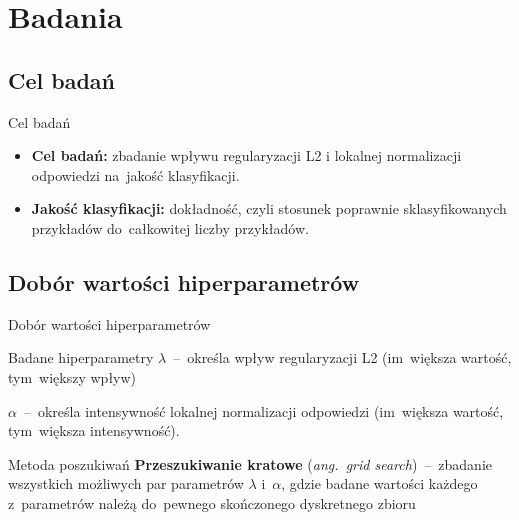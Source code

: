 \documentclass[xcolor=dvipsnames]{beamer}
\begin{document}
\section{Badania}
\subsection{Cel badań}
\begin{frame}{Cel badań}
	\begin{itemize}
	    \item \textbf{Cel badań:} zbadanie wpływu regularyzacji L2 i lokalnej normalizacji odpowiedzi na~jakość
	    klasyfikacji.
	    \item \textbf{Jakość klasyfikacji:} dokładność, czyli stosunek poprawnie sklasyfikowanych przykładów
	           do~całkowitej liczby przykładów.
    \end{itemize}
\end{frame}
\subsection{Dobór wartości hiperparametrów}
\begin{frame}{Dobór wartości hiperparametrów}
    \begin{block}{Badane hiperparametry}
        \textbf{$\lambda$}~--~określa wpływ regularyzacji L2 (im~większa wartość, tym~większy wpływ)

        \vspace{2mm}
        \textbf{$\alpha$}~--~określa intensywność lokalnej normalizacji odpowiedzi (im~większa wartość,
        tym~większa intensywność).
    \end{block}
    \begin{block}{Metoda poszukiwań}
        \textbf{Przeszukiwanie kratowe} (\textit{ang.~grid search})~--~zbadanie wszystkich możliwych par parametrów
        $\lambda$ i~$\alpha$, gdzie badane wartości każdego z~parametrów należą do~pewnego skończonego dyskretnego
        zbioru
    \end{block}
\end{frame}
\end{document}
